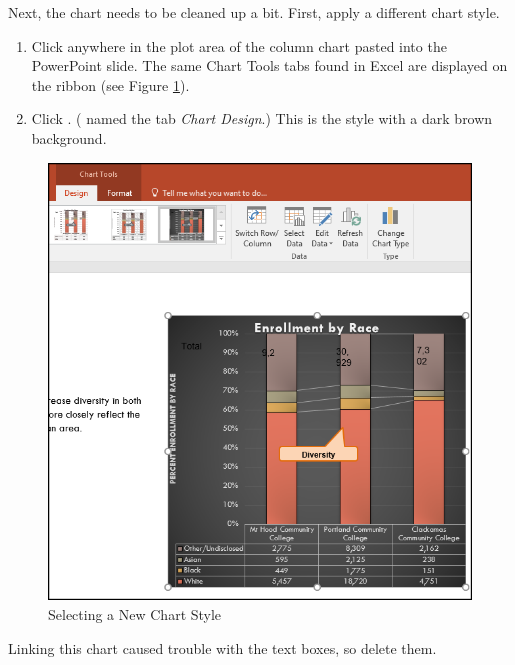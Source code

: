 Next, the chart needs to be cleaned up a bit. First, apply a different chart style.

\begin{enumbox}
	\begin{enumerate}
		\item Click anywhere in the plot area of the column chart pasted into the PowerPoint slide. The same Chart Tools tabs found in Excel are displayed on the ribbon (see Figure \ref{04:fig50}).
		\item Click . ( named the tab \textit{Chart Design}.) This is the style with a dark brown background.
	\end{enumerate}
\end{enumbox}
	
\begin{figure}[H]
	\centering
	\includegraphics[width=\maxwidth{.85\linewidth}]{gfx/ch04_fig50}
	\caption{Selecting a New Chart Style}
	\label{04:fig50}
\end{figure}

Linking this chart caused trouble with the text boxes, so delete them.

